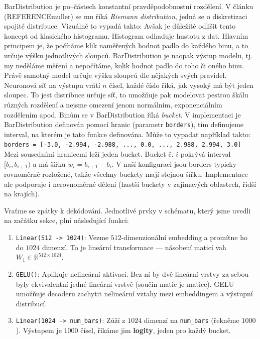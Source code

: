 BarDistribution je po–částech konstantní pravděpodobnostní rozdělení.
V článku (REFERENCEmuller) se mu říká \textit{Riemann distribution}, jedná se o diskretizaci spojité distribuce.
Vizuálně to vypadá takto:
Avšak je důležité odlišit tento koncept od klasického histogramu.
Histogram odhaduje hustotu z dat.
Hlavním principem je, že počítáme klik naměřených hodnot padlo do každého binu, a to určuje výšku jednotlivých sloupců.
BarDistribution je naopak výstup modelu, tj. my neděláme měření a nepočítáme, kolik hodnot padlo do toho či oného binu.
Právě samotný model určuje výšku sloupců dle nějakých svých pravidel.
Neuronová síť na výstupu vrátí $n$ čísel, každé číslo říká, jak vysoký má být jeden sloupec. 
To jest distribuce určuje síť, to umožňuje pak modelovat pestrou škálu různých rozdělení a nejsme omezení jenom normálním, exponenciálním rozdělením apod.
Binům se v BarDistribution říká \textit{bucket}.
V implementaci je BarDistribution definován pomocí hranic (parametr \texttt{borders}), tím definujeme interval, na kterém je tato funkce definována.
Může to vypadat například takto:\newline
\verb|borders = [-3.0, -2.994, -2.988, ..., 0.0, ..., 2.988, 2.994, 3.0]| 
Mezi sousedními hranicemi leží jeden bucket. 
Bucket č. $i$ pokrývá interval $[b_i, b_{i+1})$ a má šířku $w_i = b_{i+1} - b_i$.
V naší konfiguraci jsou borders typicky rovnoměrně rozložené, takže všechny buckety mají stejnou šířku. 
Implementace ale podporuje i nerovnoměrné dělení (hustší buckety v zajímavých oblastech, řidší na krajích).
\par   

Vraťme se zpátky k dekódování.
Jednotlivé prvky v schématu, který jsme uvedli na začátku sekce, plní následující funkci:
\begin{enumerate}
    \item \lstinline|Linear(512 -> 1024)|: Vezme $512$-dimenzionální embedding a promítne ho do $1024$ dimenzí. 
    To je lineární transformace — násobení maticí vah $W_1 \in \mathbb{R}^{512 \times 1024}$.
    \item \lstinline|GELU()|: Aplikuje nelineární aktivaci. 
    Bez ní by dvě lineární vrstvy za sebou byly ekvivalentní jedné lineární vrstvě (součin matic je matice). 
    GELU umožňuje decoderu zachytit nelineární vztahy mezi embeddingem a výstupní distribucí.
    \item \lstinline|Linear(1024 -> num_bars)|: Zúží z $1024$ dimenzí na \lstinline|num_bars| (řekněme $1000$). 
    Výstupem je $1000$ čísel, říkáme jim \textbf{logity}, jeden pro každý bucket.
\end{enumerate}

